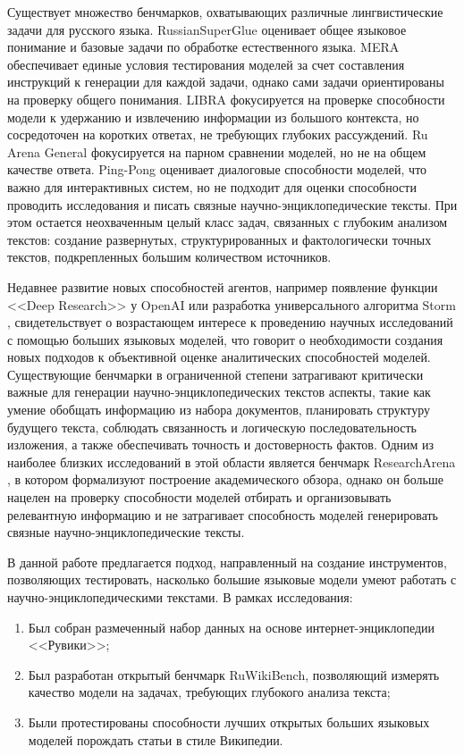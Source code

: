 \documentclass{article}
\begin{document}
Существует множество бенчмарков, охватывающих различные лингвистические задачи для русского языка.
RussianSuperGlue \cite{rsglue} оценивает общее языковое понимание и базовые задачи по обработке естественного языка. 
MERA \cite{mera} обеспечивает единые условия тестирования моделей за счет составления инструкций к генерации для каждой задачи, однако сами задачи ориентированы на проверку общего понимания. 
LIBRA \cite{libra} фокусируется на проверке способности модели к удержанию и извлечению информации из большого контекста, но сосредоточен на коротких ответах, не требующих глубоких рассуждений. 
Ru Arena General \cite{arena} фокусируется на парном сравнении моделей, но не на общем качестве ответа.
Ping-Pong \cite{pp} оценивает диалоговые способности моделей, что важно для интерактивных систем, но не подходит для оценки способности проводить исследования и писать связные научно-энциклопедические тексты.
При этом остается неохваченным целый класс задач, связанных с глубоким анализом текстов: создание развернутых, структурированных и фактологически точных текстов, подкрепленных большим количеством источников. 

Недавнее развитие новых способностей агентов, например появление функции <<Deep Research>> у OpenAI \cite{deepr} или разработка универсального алгоритма Storm \cite{storm}, 
свидетельствует о возрастающем интересе к проведению научных исследований с помощью больших языковых моделей, 
что говорит о необходимости создания новых подходов к объективной оценке аналитических способностей моделей. 
Существующие бенчмарки в ограниченной степени затрагивают критически важные для генерации научно-энциклопедических текстов аспекты, 
такие как умение обобщать информацию из набора документов, планировать структуру будущего текста, соблюдать связанность и логическую последовательность изложения, а также обеспечивать точность и достоверность фактов. 
Одним из наиболее близких исследований в этой области является бенчмарк ResearchArena \cite{resar}, в котором формализуют построение академического обзора, 
однако он больше нацелен на проверку способности моделей отбирать и организовывать релевантную информацию и не затрагивает способность моделей генерировать связные научно-энциклопедические тексты.

В данной работе предлагается подход, направленный на создание 
инструментов, позволяющих тестировать, насколько большие языковые модели умеют работать с научно-энциклопедическими текстами.
В рамках исследования:
\begin{enumerate}

    \item Был собран размеченный набор данных на основе интернет-энциклопедии <<Рувики>>;
    
    \item Был разработан открытый бенчмарк RuWikiBench, позволяющий измерять качество модели на задачах, требующих глубокого анализа текста;
    
    \item Были протестированы способности лучших открытых больших языковых моделей порождать статьи в стиле Википедии.

\end{enumerate}
\end{document}
